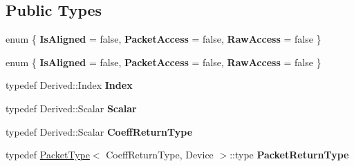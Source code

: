 \subsection*{Public Types}
\begin{DoxyCompactItemize}
\item 
\mbox{\label{struct_eigen_1_1_tensor_evaluator_3_01_tensor_ref_3_01_derived_01_4_00_01_device_01_4_a679953482dad9df21b9e144982823c74}} 
enum \{ {\bfseries Is\+Aligned} = false, 
{\bfseries Packet\+Access} = false, 
{\bfseries Raw\+Access} = false
 \}
\item 
\mbox{\label{struct_eigen_1_1_tensor_evaluator_3_01_tensor_ref_3_01_derived_01_4_00_01_device_01_4_a2809fba643c3133b02ca45a1cb34eb72}} 
enum \{ {\bfseries Is\+Aligned} = false, 
{\bfseries Packet\+Access} = false, 
{\bfseries Raw\+Access} = false
 \}
\item 
\mbox{\label{struct_eigen_1_1_tensor_evaluator_3_01_tensor_ref_3_01_derived_01_4_00_01_device_01_4_a8c2c712d11f1978eb7f4bd4f3acc5afe}} 
typedef Derived\+::\+Index {\bfseries Index}
\item 
\mbox{\label{struct_eigen_1_1_tensor_evaluator_3_01_tensor_ref_3_01_derived_01_4_00_01_device_01_4_abc3e1dd82950bad88dbe24f8d2d500f6}} 
typedef Derived\+::\+Scalar {\bfseries Scalar}
\item 
\mbox{\label{struct_eigen_1_1_tensor_evaluator_3_01_tensor_ref_3_01_derived_01_4_00_01_device_01_4_a326cb822019fc413c508a4a75d25ccf6}} 
typedef Derived\+::\+Scalar {\bfseries Coeff\+Return\+Type}
\item 
\mbox{\label{struct_eigen_1_1_tensor_evaluator_3_01_tensor_ref_3_01_derived_01_4_00_01_device_01_4_a0b53ae8b392fb25142666647c99c021d}} 
typedef \hyperlink{struct_eigen_1_1_packet_type}{Packet\+Type}$<$ Coeff\+Return\+Type, Device $>$\+::type {\bfseries Packet\+Return\+Type}

\end{DoxyCompactItemize}
